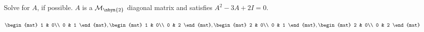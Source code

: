 
\begin{Exercise}[
name={},
title={}, 
difficulty=0,
origin={\cite{BS}}]
Solve for $A$, if possible.  $A$ is a $\mathcal{M}_{\nbyn{2}}$ diagonal matrix and satisfies
$A^2-3A+2I=0$.
\end{Exercise}

\begin{Answer}
$\begin{mat}
1 & 0\\
0 & 1
\end{mat},
\begin{mat}
1 & 0\\
0 & 2
\end{mat},
\begin{mat}
2 & 0\\
0 & 1
\end{mat},
\begin{mat}
2 & 0\\
0 & 2
\end{mat}$
\end{Answer}
